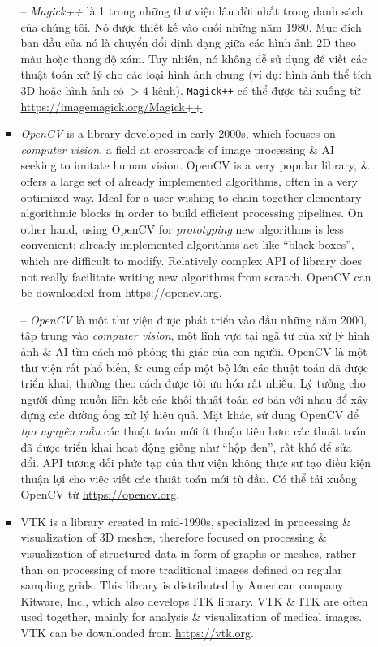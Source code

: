 \documentclass{article}
\begin{document}
\begin{itemize}
\begin{itemize}
\begin{itemize}
            -- {\it Magick++} là 1 trong những thư viện lâu đời nhất trong danh sách của chúng tôi. Nó được thiết kế vào cuối những năm 1980. Mục đích ban đầu của nó là chuyển đổi định dạng giữa các hình ảnh 2D theo màu hoặc thang độ xám. Tuy nhiên, nó không dễ sử dụng để viết các thuật toán xử lý cho các loại hình ảnh chung (ví dụ: hình ảnh thể tích 3D hoặc hình ảnh có $> 4$ kênh). {\tt Magick++} có thể được tải xuống từ \url{https://imagemagick.org/Magick++}.
            
            \item {\it OpenCV} is a library developed in early 2000s, which focuses on {\it computer vision}, a field at crossroads of image processing \& AI seeking to imitate human vision. OpenCV is a very popular library, \& offers a large set of already implemented algorithms, often in a very optimized way. Ideal for a user wishing to chain together elementary algorithmic blocks in order to build efficient processing pipelines. On other hand, using OpenCV for {\it prototyping} new algorithms is less convenient: already implemented algorithms act like ``black boxes'', which are difficult to modify. Relatively complex API of library does not really facilitate writing new algorithms from scratch. OpenCV can be downloaded from \url{https://opencv.org}.
            
            -- {\it OpenCV} là một thư viện được phát triển vào đầu những năm 2000, tập trung vào {\it computer vision}, một lĩnh vực tại ngã tư của xử lý hình ảnh \& AI tìm cách mô phỏng thị giác của con người. OpenCV là một thư viện rất phổ biến, \& cung cấp một bộ lớn các thuật toán đã được triển khai, thường theo cách được tối ưu hóa rất nhiều. Lý tưởng cho người dùng muốn liên kết các khối thuật toán cơ bản với nhau để xây dựng các đường ống xử lý hiệu quả. Mặt khác, sử dụng OpenCV để {\it tạo nguyên mẫu} các thuật toán mới ít thuận tiện hơn: các thuật toán đã được triển khai hoạt động giống như ``hộp đen'', rất khó để sửa đổi. API tương đối phức tạp của thư viện không thực sự tạo điều kiện thuận lợi cho việc viết các thuật toán mới từ đầu. Có thể tải xuống OpenCV từ \url{https://opencv.org}.
            
            \item VTK is a library created in mid-1990s, specialized in processing \& visualization of 3D meshes, therefore focused on processing \& visualization of structured data in form of graphs or meshes, rather than on processing of more traditional images defined on regular sampling grids. This library is distributed by American company Kitware, Inc., which also develops ITK library. VTK \& ITK are often used together, mainly for analysis \& visualization of medical images. VTK can be downloaded from \url{https://vtk.org}.
            

\end{itemize}
\end{itemize}
\end{itemize}
\end{document}

